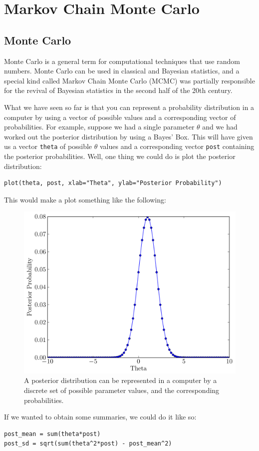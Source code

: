 \chapter{Markov Chain Monte Carlo}
\section{Monte Carlo}
Monte Carlo is a general term for computational techniques that use random
numbers.
Monte Carlo can be used in classical and Bayesian statistics, and a special kind
called Markov Chain Monte Carlo (MCMC) was partially responsible for the revival
of Bayesian statistics in the second half of the 20th century.

What we have seen so far is that you can represent a probability distribution
in a computer by using a vector of possible values and a corresponding
vector of probabilities. For example, suppose we had a single parameter $\theta$
and we had worked out the posterior distribution by using a Bayes' Box. This
will have given us a vector {\tt theta} of possible $\theta$ values and a corresponding
vector {\tt post} containing the posterior probabilities. Well, one thing we could
do is plot the posterior distribution:
\begin{verbatim}
plot(theta, post, xlab="Theta", ylab="Posterior Probability")
\end{verbatim}
This would make a plot something like the following:
\begin{figure}[ht!]
\begin{center}
\includegraphics[scale=0.5]{Figures/normal.pdf}
\caption{A posterior distribution can be represented in a computer by a discrete
set of possible parameter values, and the corresponding probabilities.\label{fig:normal}}
\end{center}
\end{figure}
If we wanted to obtain some summaries, we could do it like so:
\begin{verbatim}
post_mean = sum(theta*post)
post_sd = sqrt(sum(theta^2*post) - post_mean^2)
\end{verbatim}

